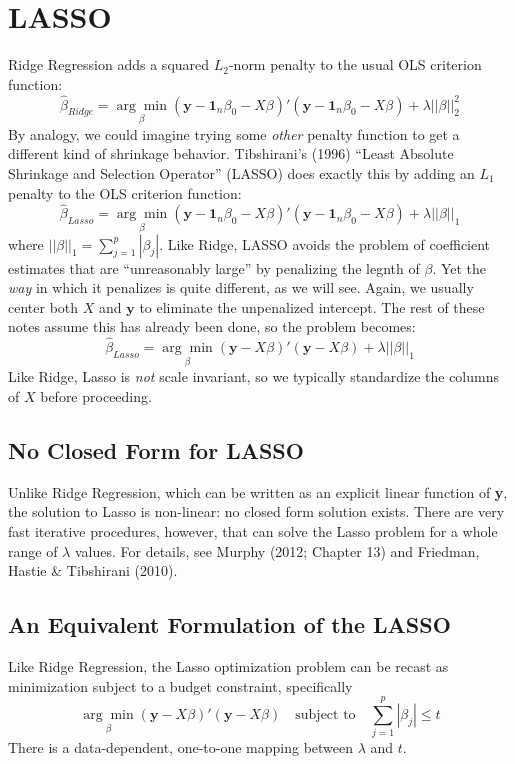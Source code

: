 \section{LASSO}
Ridge Regression adds a squared $L_2$-norm penalty to the usual OLS criterion function:
	$$\widehat{\beta}_{Ridge} =\underset{\beta}{\arg \min} (\mathbf{y} - \textbf{1}_n\beta_0 - X\beta)' (\mathbf{y} - \textbf{1}_n \beta_0 - X\beta) + \lambda \left| \left| \beta\right| \right|_2^2$$
By analogy, we could imagine trying some \emph{other} penalty function to get a different kind of shrinkage behavior. Tibshirani's (1996) ``Least Absolute Shrinkage and Selection Operator'' (LASSO) does exactly this by adding an $L_1$ penalty to the OLS criterion function:
	$$\widehat{\beta}_{Lasso} =\underset{\beta}{\arg \min} (\mathbf{y} - \textbf{1}_n\beta_0 - X\beta)' (\mathbf{y} - \textbf{1}_n \beta_0 - X\beta) + \lambda \left| \left| \beta\right| \right|_1$$
where $\left| \left| \beta\right|\right|_1 = \sum_{j=1}^p |\beta_j|$. Like Ridge, LASSO avoids the problem of coefficient estimates that are ``unreasonably large'' by penalizing the legnth of $\beta$. Yet the \emph{way} in which it penalizes is quite different, as we will see. Again, we usually center both $X$ and $\mathbf{y}$ to eliminate the unpenalized intercept. The rest of these notes assume this has already been done, so the problem becomes:
	$$\widehat{\beta}_{Lasso} =\underset{\beta}{\arg \min} (\mathbf{y}  - X\beta)' (\mathbf{y} - X\beta) + \lambda \left| \left| \beta\right| \right|_1$$
Like Ridge, Lasso is \emph{not} scale invariant, so we typically standardize the columns of $X$ before proceeding.

\subsection{No Closed Form for LASSO}
Unlike Ridge Regression, which can be written as an explicit linear function of \textbf{y}, the solution to Lasso is non-linear: no closed form solution exists. There are very fast iterative procedures, however, that can solve the Lasso problem for a whole range of $\lambda$ values. For details, see Murphy (2012; Chapter 13) and Friedman, Hastie \& Tibshirani (2010). 

\subsection{An Equivalent Formulation of the LASSO}
Like Ridge Regression, the Lasso optimization problem can be recast as minimization subject to a budget constraint, specifically
	$$\underset{\beta}{\arg \min} (\mathbf{y}  - X\beta)' (\mathbf{y} - X\beta) \quad \mbox{subject to}\quad \sum_{j=1}^p |\beta_j| \leq t$$
There is a data-dependent, one-to-one mapping between $\lambda$ and $t$.


